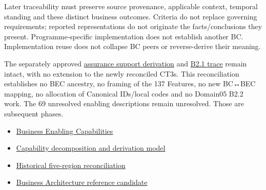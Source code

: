 Later traceability must preserve source provenance, applicable context, temporal standing and these distinct business outcomes. Criteria do not replace governing requirements; reported representations do not originate the facts/\allowbreak{}conclusions they present. Programme-specific implementation does not establish another BC. Implementation reuse does not collapse BC peers or reverse-derive their meaning.

\label{rad:business:1314}

The separately approved \hyperref[rad:assurance-strategy]{assurance support derivation} and \hyperref[rad:b2-1]{B2.1 trace} remain intact, with no extension to the newly reconciled CT3s. This reconciliation establishes no BEC ancestry, no framing of the 137 Features, no new BC↔BEC mapping, no allocation of Canonical IDs/\allowbreak{}local codes and no Domain05 B2.2 work. The 69 unresolved enabling descriptions remain unresolved. Those are subsequent phases.

\label{rad:business:1321}

\begin{itemize}

\item 
\hyperref[rad:enabling]{Business Enabling Capabilities}



\item 
\hyperref[rad:tier-model]{Capability decomposition and derivation model}



\item 
\href{https://github.com/fhirfactory/harmonia/blob/98410db60155198a75f74c79d98060070209faa1/docs/markdown/02-strategy/reviews/business-capability-five-region-reconciliation.md}{Historical five-region reconciliation}



\item 
\href{https://github.com/fhirfactory/harmonia/blob/98410db60155198a75f74c79d98060070209faa1/docs/markdown/03-business-architecture/reference-model/README.md}{Business Architecture reference candidate}



\end{itemize}
